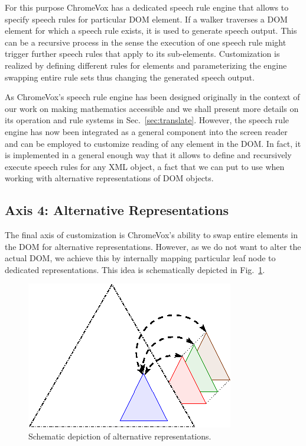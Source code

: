 \documentclass{acm_proc_article-sp}
\begin{document}
For this purpose ChromeVox has a dedicated speech rule engine that allows to
specify speech rules for particular DOM element. If a walker traverses a DOM
element for which a speech rule exists, it is used to generate speech
output. This can be a recursive process in the sense the execution of one speech
rule might trigger further speech rules that apply to its sub-elements.
Customization is realized by defining different rules for elements and
parameterizing the engine swapping entire rule sets thus changing the generated
speech output.

As ChromeVox's speech rule engine has been designed originally in the context of
our work on making mathematics accessible and we shall present more details on
its operation and rule systems in Sec.~\ref{sec:translate}. However, the speech
rule engine has now been integrated as a general component into the screen
reader and can be employed to customize reading of any element in the DOM. In
fact, it is implemented in a general enough way that it allows to define and
recursively execute speech rules for any XML object, a fact that we can put to
use when working with alternative representations of DOM objects.


\subsection{Axis 4: Alternative Representations}
\label{sec:ax4}


The final axis of customization is ChromeVox's ability to swap entire elements
in the DOM for alternative representations. However, as we do not want to alter
the actual DOM, we achieve this by internally mapping particular leaf node to
dedicated representations. This idea is schematically depicted in
Fig.~\ref{fig:alt}.

\begin{figure}[ht!]
  \begin{center}
    \leavevmode
    \includegraphics[width=.5\columnwidth]{images/substructure1}
    \caption{Schematic depiction of alternative representations.}
    \label{fig:alt}
  \end{center}
\end{figure}
\end{document}
